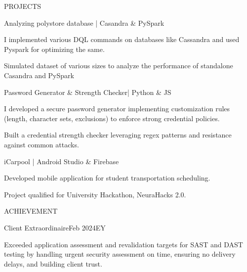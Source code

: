 \documentclass{resume} %
\begin{document}
\begin{rSection}{PROJECTS}
\begin{rSubsection}{Analyzing polystore database | Casandra \& PySpark} \hfill{}

\item I implemented various DQL commands on databases like Cassandra and used Pyspark for optimizing the same. 
\item Simulated dataset of various sizes to analyze the performance of standalone Casandra and PySpark
\end{rSubsection}

\begin{rSubsection}
{Password Generator \& Strength Checker| Python \&  JS} \hfill{}

\item I developed a secure password generator implementing customization rules (length, character sets, exclusions) to enforce strong credential policies.
\item Built a credential strength checker leveraging regex patterns and resistance against common attacks.
\end{rSubsection}

\begin{rSubsection}
{iCarpool | Android Studio \& Firebase} \hfill{}

\item Developed mobile application for student transportation scheduling.

\item Project qualified for University Hackathon, NeuraHacks 2.0.
\end{rSubsection}
\end{rSection}


\begin{rSection}{ACHIEVEMENT}

\begin{rSubsection}{Client Extraordinaire}{Feb 2024}{EY}{}
\item Exceeded application assessment and revalidation targets for SAST and DAST testing by handling urgent security assessment on time, ensuring no delivery delays, and building client trust. 
\end{rSubsection}
\end{rSection}
\end{document}
